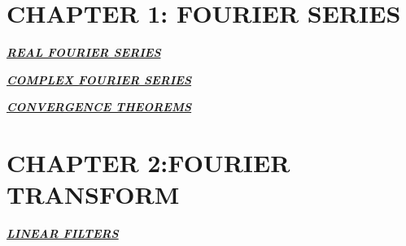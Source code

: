 \documentclass[a4paper]{article}
\begin{document}
\fontsize{10.5}{6}
\selectfont
\begin{multicols}{2}
%
%
%
%
%

\section*{CHAPTER 1: FOURIER SERIES}

\underline{\textsl{\bf REAL FOURIER SERIES}}



\underline{\textsl{\bf COMPLEX FOURIER SERIES}}


\underline{\textsl{\bf CONVERGENCE THEOREMS}}









\section*{CHAPTER 2:FOURIER TRANSFORM}





\underline{\textsl{\bf LINEAR FILTERS}}







\end{multicols}
\end{document}

